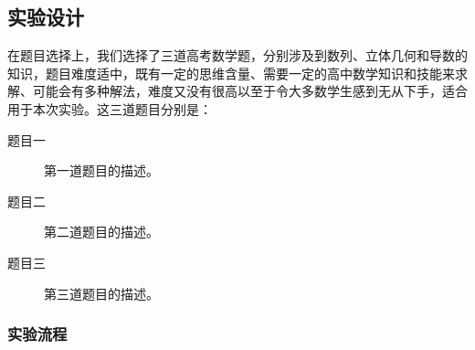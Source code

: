 \subsection{实验设计}
在题目选择上，我们选择了三道高考数学题，分别涉及到数列、立体几何和导数的知识，题目难度适中，既有一定的思维含量、需要一定的高中数学知识和技能来求解、可能会有多种解法，难度又没有很高以至于令大多数学生感到无从下手，适合用于本次实验。这三道题目分别是：

\begin{description}
    \item[题目一] 第一道题目的描述。
    \item[题目二] 第二道题目的描述。
    \item[题目三] 第三道题目的描述。
\end{description}

\subsubsection{实验流程}